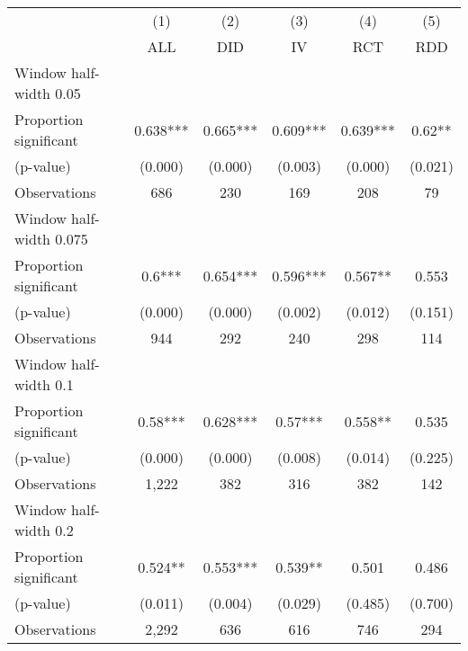 
\def\sym#1{\ifmmode^{#1}\else\(^{#1}\)\fi}
\begin{tabular}{l*{5}{c}}
\hline\hline
& \multicolumn{1}{c}{(1)} &  \multicolumn{1}{c}{(2)} &  \multicolumn{1}{c}{(3)} &  \multicolumn{1}{c}{(4)} &  \multicolumn{1}{c}{(5)}\\
& \multicolumn{1}{c}{ALL} &  \multicolumn{1}{c}{DID} &  \multicolumn{1}{c}{IV} &  \multicolumn{1}{c}{RCT} &  \multicolumn{1}{c}{RDD}\\

\hline
\hline
Window half-width 0.05\\

Proportion significant& 0.638*** &  0.665*** &  0.609*** &  0.639*** &  0.62**\\

(p-value) & (0.000) &  (0.000) &  (0.003) &  (0.000) &  (0.021)\\

Observations& 686 &  230 &  169 &  208 &  79\\

\hline
Window half-width 0.075\\

Proportion significant& 0.6*** &  0.654*** &  0.596*** &  0.567** &  0.553\\

(p-value) & (0.000) &  (0.000) &  (0.002) &  (0.012) &  (0.151)\\

Observations& 944 &  292 &  240 &  298 &  114\\

\hline
Window half-width 0.1\\

Proportion significant& 0.58*** &  0.628*** &  0.57*** &  0.558** &  0.535\\

(p-value) & (0.000) &  (0.000) &  (0.008) &  (0.014) &  (0.225)\\

Observations& 1,222 &  382 &  316 &  382 &  142\\

\hline
Window half-width 0.2\\

Proportion significant& 0.524** &  0.553*** &  0.539** &  0.501 &  0.486\\

(p-value) & (0.011) &  (0.004) &  (0.029) &  (0.485) &  (0.700)\\

Observations& 2,292 &  636 &  616 &  746 &  294\\


\end{tabular}
